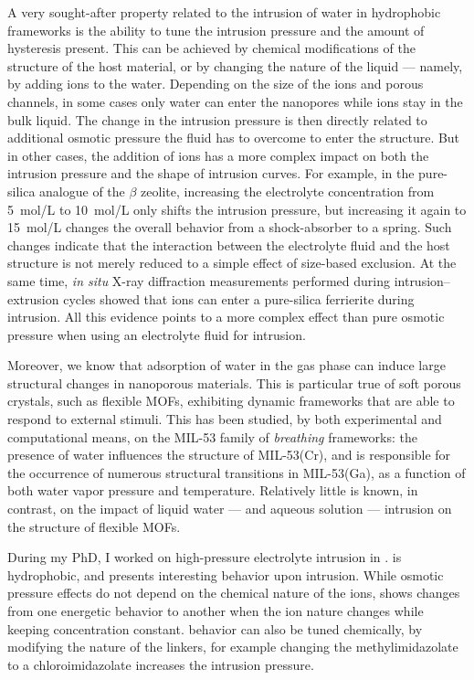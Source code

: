 \documentclass[thesis]{subfiles}
\begin{document}
A very sought-after property related to the intrusion of water in hydrophobic
frameworks is the ability to tune the intrusion pressure and the amount of
hysteresis present. This can be achieved by chemical modifications of the
structure of the host material\cite{AOrtiz2014}, or by changing the nature of
the liquid --- namely, by adding ions to the water\cite{Ortiz2014}. Depending on
the size of the ions and porous channels, in some cases only water can enter the
nanopores while ions stay in the bulk liquid. The change in the intrusion
pressure is then directly related to additional osmotic pressure the fluid has
to overcome to enter the structure\cite{MichelinJamois2015}. But in other cases,
the addition of ions has a more complex impact on both the intrusion pressure
and the shape of intrusion curves. For example, in the pure-silica analogue of
the $\beta$ zeolite\cite{Camblor1996}, increasing the electrolyte concentration
from \SI{5}{mol/L} to \SI{10}{mol/L} only shifts the intrusion pressure, but
increasing it again to \SI{15}{mol/L} changes the overall behavior from a
shock-absorber to a spring\cite{Ryzhikov2014}. Such changes indicate that the
interaction between the electrolyte fluid and the host structure is not merely
reduced to a simple effect of size-based exclusion. At the same time, \emph{in
situ} X-ray diffraction measurements performed during intrusion--extrusion
cycles showed that  ions can enter a pure-silica ferrierite during
intrusion\cite{Arletti2016}. All this evidence points to a more complex effect
than pure osmotic pressure when using an electrolyte fluid for intrusion.

Moreover, we know that adsorption of water in the gas phase can induce large
structural changes in nanoporous materials\cite{Lee2001, Seoung2013}. This is
particular true of soft porous crystals\cite{Horike2009}, such as flexible
MOFs\cite{Schneemann2014}, exhibiting dynamic frameworks that are able to
respond to external stimuli. This has been studied, by both experimental and
computational means, on the MIL-53 family of \emph{breathing} frameworks: the
presence of water influences the structure of MIL-53(Cr)\cite{Haigis2013}, and
is responsible for the occurrence of numerous structural transitions in
MIL-53(Ga), as a function of both water vapor pressure and
temperature\cite{Boutin2013, Coudert2014}. Relatively little is known, in
contrast, on the impact of liquid water --- and aqueous solution --- intrusion
on the structure of flexible MOFs.

During my PhD, I worked on high-pressure electrolyte intrusion in . 
is hydrophobic\cite{AOrtiz2014}, and presents interesting behavior upon
intrusion. While osmotic pressure effects do not depend on the chemical nature
of the ions,  shows changes from one energetic behavior to another when the
ion nature changes while keeping concentration constant\cite{Ortiz2014}. 
behavior can also be tuned chemically, by modifying the nature of the linkers,
for example changing the methylimidazolate to a chloroimidazolate increases the
intrusion pressure\cite{Mortada2018}.
\end{document}
